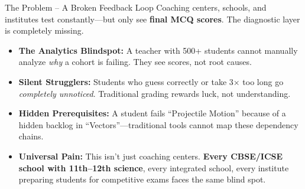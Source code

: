 \documentclass[aspectratio=169, 10pt]{beamer}
\newcommand{\bspace}{\vspace{0.3em}}
\begin{document}
\begin{frame}{The Problem -- A Broken Feedback Loop}
  \small
  Coaching centers, schools, and institutes test constantly---but only see \textbf{final MCQ scores}. The diagnostic layer is completely missing.

  \bspace
  \begin{itemize}
    \setlength\itemsep{0.5em}
    \item \textbf{\textcolor{LearnRed}{The Analytics Blindspot:}} A teacher with 500+ students cannot manually analyze \emph{why} a cohort is failing. They see scores, not root causes.

    \item \textbf{\textcolor{LearnRed}{Silent Strugglers:}} Students who guess correctly or take 3$\times$ too long go \emph{completely unnoticed}. Traditional grading rewards luck, not understanding.

    \item \textbf{\textcolor{LearnRed}{Hidden Prerequisites:}} A student fails ``Projectile Motion'' because of a hidden backlog in ``Vectors''---traditional tools cannot map these dependency chains.

    \item \textbf{\textcolor{LearnRed}{Universal Pain:}} This isn't just coaching centers. \textbf{Every CBSE/ICSE school with 11th--12th science}, every integrated school, every institute preparing students for competitive exams faces the same blind spot.
  \end{itemize}
\end{frame}
\end{document}
